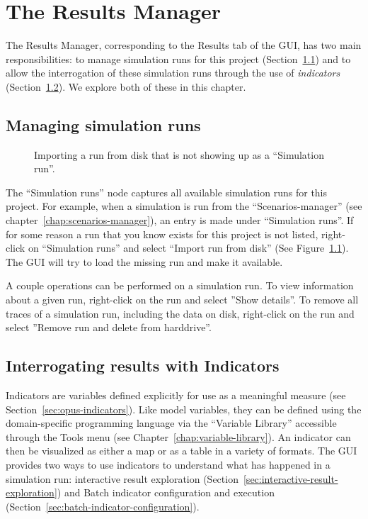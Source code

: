 
\chapter{The Results Manager}

The Results Manager, corresponding to the Results tab of the GUI, has
two main responsibilities: to manage simulation runs for this project
(Section~\ref{sec:managing-simulation-runs}) and to allow the
interrogation of these simulation runs through the use of
\emph{indicators}
(Section~\ref{sec:interrogating-results-with-indicators}). We explore
both of these in this chapter.

\section{Managing simulation runs}
\label{sec:managing-simulation-runs}

\begin{figure}[tp]
\begin{center}
\end{center}
\caption{Importing a run from disk that is not showing up as a
``Simulation run''.}
\label{fig:results-manager-import-run}
\end{figure}

The ``Simulation runs'' node captures all
available simulation runs for this project. For example, when a
simulation is run from the ``Scenarios-manager'' (see
chapter~\ref{chap:scenarios-manager}), an entry is made under
``Simulation runs''. If for some reason a run that you know exists
for this project is not listed, right-click on 
``Simulation runs'' and select ``Import run from disk'' (See
Figure~\ref{fig:results-manager-import-run}). The GUI will try to load
the missing run and make it available.

A couple operations can be performed on a simulation run. To view
information about a given run, right-click on the run and select
''Show details''. To remove all traces of a simulation run,
including the data on disk, right-click on the run and select
''Remove run and delete from harddrive''.

\section{Interrogating results with Indicators}
\label{sec:interrogating-results-with-indicators}

Indicators are variables defined explicitly for use as a meaningful
measure (see Section~\ref{sec:opus-indicators}). Like model variables,
they can be defined using the domain-specific programming language via
the ``Variable Library'' accessible through the Tools menu (see
Chapter~\ref{chap:variable-library}). An indicator can then be
visualized as either a map or as a table in a variety of
formats. The GUI provides two ways to use indicators to understand what
has happened in a simulation run: interactive result exploration
(Section~\ref{sec:interactive-result-exploration}) and Batch
indicator configuration and execution
(Section~\ref{sec:batch-indicator-configuration}).

